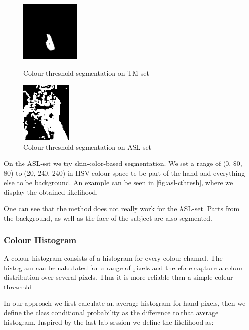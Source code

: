 \documentclass[letterpaper, 10 pt, conference]{ieeeconf}  %
\begin{document}
\begin{figure}[ht!]
\centering
\begin{minipage}{0.4\linewidth}
	\centering
\includegraphics[height=3cm]{tm-segment}
\caption{Colour threshold segmentation on TM-set}
\label{fig:tm-cthresh}
\end{minipage}
\hfill
\begin{minipage}{0.4\linewidth}
	\centering
\includegraphics[height=3cm]{asl-segment}
\caption{Colour threshold segmentation on ASL-set}
\label{fig:asl-cthresh}
\end{minipage}
\end{figure}

On the ASL-set we try skin-color-based segmentation. We set a range of (0, 80, 80) to (20, 240, 240) in HSV colour space to be part of the hand and everything else to be background. An example can be seen in \autoref{fig:asl-cthresh}, where we display the obtained likelihood.

One can see that the method does not really work for the ASL-set. Parts from the background, as well as the face of the subject are also segmented.

\subsubsection{Colour Histogram}

A colour histogram consists of a histogram for every colour channel. The histogram can be calculated for a range of pixels and therefore capture a colour distribution over several pixels. Thus it is more reliable than a simple colour threshold.

In our approach we first calculate an average histogram for hand pixels, then we define the class conditional probability as the difference to that average histogram. Inspired by the last lab session we define the likelihood as:
\end{document}
